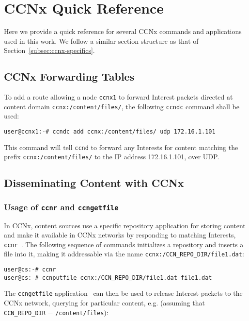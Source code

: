 \chapter{CCNx Quick Reference}
\label{app:ccnx-specificss}

Here we provide a quick reference for several CCNx commands and applications 
used in this work. We follow a similar section structure as that of 
Section~\ref{subsec:ccnx-specifics}.

\section{CCNx Forwarding Tables}

To add a route allowing a node \verb+ccnx1+ to forward Interest packets 
directed at content domain \verb+ccnx:/content/files/+, the following 
\verb+ccndc+ command shall be used:

\begin{verbatim}
user@ccnx1:-# ccndc add ccnx:/content/files/ udp 172.16.1.101
\end{verbatim}

This command will tell \verb+ccnd+ to forward any Interests for content matching 
the prefix \verb+ccnx:/content/files/+ to the IP address 172.16.1.101, over UDP.

\section{Disseminating Content with CCNx}

\cprotect\subsection{Usage of \verb+ccnr+ and \verb+ccngetfile+}

In CCNx, content sources use a specific repository application for storing 
content and make it available in CCNx networks by responding to 
matching Interests, \verb+ccnr+~\cite{website:ccnx-commands}. The following 
sequence of commands initializes a repository and inserts a file into it, 
making it addressable via the name \verb+ccnx:/CCN_REPO_DIR/file1.dat+:

\begin{verbatim}
user@cs:-# ccnr
user@cs:-# ccnputfile ccnx:/CCN_REPO_DIR/file1.dat file1.dat
\end{verbatim}

The 
\verb+ccngetfile+ application~\cite{website:ccnx-commands} 
can then be used to release Interest packets to the CCNx network, querying 
for particular content, e.g. (assuming that 
\verb+CCN_REPO_DIR+ = \verb+/content/files+):

